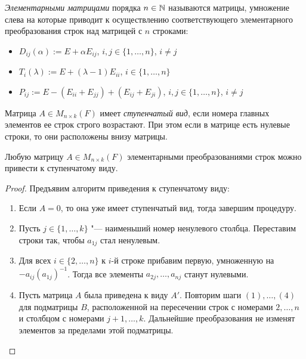     \begin{definition}
    	\textit{Элементарными матрицами} порядка $n \in \mathbb{N}$ называются матрицы, умножение слева
    	на которые приводит к осуществлению соответствующего элементарного преобразования строк над матрицей с $n$ строками:
    	\begin{itemize}
    		\item $D_{ij}(\alpha) := E + \alpha E_{ij}$, $i, j \in \{1, \dotsc, n\}$, $i \ne j$
    		\item $T_{i}(\lambda) := E + (\lambda - 1) E_{ii}$, $i \in \{1, \dotsc, n\}$
    		\item $P_{ij} := E - (E_{ii} + E_{jj}) + (E_{ij} + E_{ji})$, $i, j \in \{1, \dotsc, n\}$, $i \ne j$
    	\end{itemize}
    \end{definition}
    
    \begin{definition}
    	Матрица $A \in M_{n \times k}(F)$ имеет \textit{ступенчатый вид}, если номера главных элементов ее строк строго возрастают. При этом если в матрице есть нулевые строки, то они расположены внизу матрицы.
    \end{definition}
    
    \begin{theorem}
    	Любую матрицу $A \in M_{n \times k}(F)$ элементарными преобразованиями строк можно привести к ступенчатому виду.
    \end{theorem}
    
    \begin{proof}
    	Предъявим алгоритм приведения к ступенчатому виду:
    	\begin{enumerate}
    		\item Если $A = 0$, то она уже имеет ступенчатый вид, тогда завершим процедуру.
    		\item Пусть $j \in \{1, \dotsc, k\}$ "--- наименьший номер ненулевого столбца. Переставим строки так, чтобы $a_{1j}$ стал ненулевым.
    		\item Для всех $i \in \{2, \dots, n\}$ к $i$-й строке прибавим первую, умноженную на $-a_{ij}(a_{1j})^{-1}$. Тогда все элементы $a_{2j}, \dots, a_{nj}$ станут нулевыми.
    		\item Пусть матрица $A$ была приведена к виду $A'$. Повторим шаги $(1), \dotsc, (4)$ для подматрицы $B$, расположенной на пересечении строк с номерами $2, \dotsc, n$ и столбцом с номерами $j + 1, \dotsc, k$. Дальнейшие преобразования не изменят элементов за пределами этой подматрицы.\qedhere
    	\end{enumerate}
    \end{proof}
    

